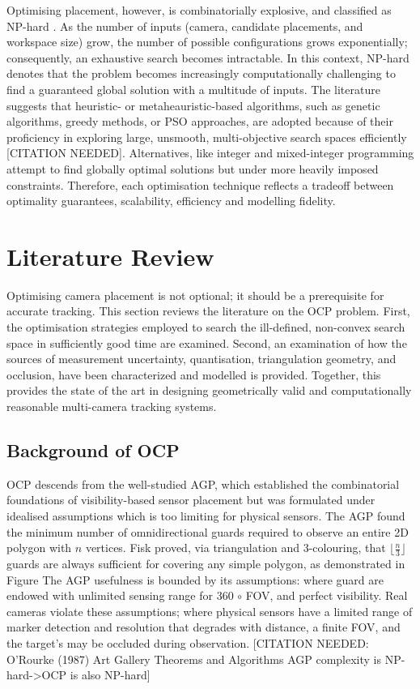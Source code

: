 Optimising placement, however, is combinatorially explosive, and classified as \gls{NP-hard} \parencite{kirchhofOptimalPlacementMultiple2013}. As the number of inputs (camera, candidate placements, and workspace size) grow, the number of possible configurations grows exponentially; consequently, an exhaustive search becomes intractable.  In this context, \gls{NP-hard} denotes that the problem becomes increasingly computationally challenging to find a guaranteed global solution with a multitude of inputs. The literature suggests that heuristic- or metaheauristic-based algorithms, such as genetic algorithms, greedy methods, or \gls{PSO} approaches, are adopted because of their proficiency in exploring large, unsmooth, multi-objective search spaces efficiently [CITATION NEEDED]. Alternatives, like integer and mixed-integer programming attempt to find globally optimal solutions but under more heavily imposed constraints. Therefore, each optimisation technique reflects a tradeoff between optimality guarantees, scalability, efficiency and modelling fidelity.

\section{Literature Review}
   
Optimising camera placement is not optional; it should be a prerequisite for accurate tracking. This section reviews the literature on the \gls{OCP} problem. First, the optimisation strategies employed to search the ill-defined, non-convex search space in sufficiently good time are examined. Second, an examination of how the sources of measurement uncertainty, quantisation, triangulation geometry,  and occlusion, have been characterized and modelled is provided.  Together, this provides the state of the art in designing geometrically valid and computationally reasonable multi-camera tracking systems.
\\
\subsection{Background of OCP}
\gls{OCP} descends from the well-studied \gls{AGP}, which established the combinatorial foundations of visibility-based sensor placement but was formulated under idealised assumptions which is too limiting for physical sensors. The \gls{AGP} found the  minimum number of omnidirectional guards required to observe an entire 2D polygon with $n$ vertices. Fisk proved, via triangulation and 3-colouring, that $\lfloor\frac{n}{3}\rfloor$ guards are always sufficient for covering any simple polygon, as demonstrated in Figure %
The AGP usefulness is bounded by its assumptions: where guard are endowed with unlimited sensing range for 360 $\circ$ \gls{FOV}, and perfect visibility. Real cameras violate these assumptions; where physical sensors have a limited range of marker detection and resolution that degrades with distance, a finite \gls{FOV}, and the target's may be occluded during observation. [CITATION NEEDED: O'Rourke (1987) Art Gallery Theorems and Algorithms  AGP complexity is NP-hard->OCP is also NP-hard]

